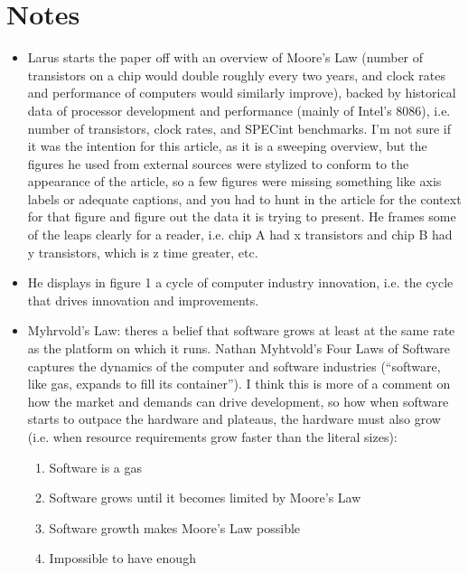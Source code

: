 \documentclass [12pt]{article}
\begin{document}

    \section{Notes}
        \begin{itemize}
            \item Larus starts the paper off with an overview of Moore's Law (number of transistors on a chip would double roughly every two years, and clock rates and performance of computers would similarly improve), backed by historical data of processor development and performance (mainly of Intel's 8086), i.e. number of transistors, clock rates, and SPECint benchmarks. I'm not sure if it was the intention for this article, as it is a sweeping overview, but the figures he used from external sources were stylized to conform to the appearance of the article, so a few figures were missing something like axis labels or adequate captions, and you had to hunt in the article for the context for that figure and figure out the data it is trying to present. He frames some of the leaps clearly for a reader, i.e. chip A had x transistors and chip B had y transistors, which is z time greater, etc.
            \item He displays in figure 1 a cycle of computer industry innovation, i.e. the cycle that drives innovation and improvements. 
            \item Myhrvold's Law: theres a belief that software grows at least at the same rate as the platform on which it runs. Nathan Myhtvold's Four Laws of Software captures the dynamics of the computer and software industries (``software, like gas, expands to fill its container''). I think this is more of a comment on how the market and demands can drive development, so how when software starts to outpace the hardware and plateaus, the hardware must also grow (i.e. when resource requirements grow faster than the literal sizes): 
                \begin{enumerate}
                    \item Software is a gas 
                    \item Software grows until it becomes limited by Moore's Law
                    \item Software growth makes Moore's Law possible
                    \item Impossible to have enough
                \end{enumerate}

\end{itemize}
\end{document}
